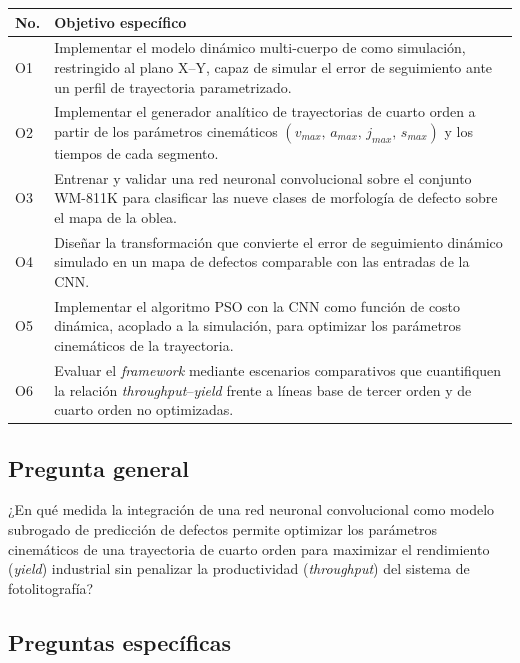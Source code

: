 \documentclass[11pt]{article}
\begin{document}
\begin{table}[H]
\centering
\small
\setlength{\tabcolsep}{6pt}
\renewcommand{\arraystretch}{1.35}
\begin{tabular}{C{0.8cm} L{14cm}}
\toprule
\textbf{No.} & \textbf{Objetivo específico} \\
\midrule
O1 & Implementar el modelo dinámico multi-cuerpo de \cite{Al-Rawashdeh2022_Caracterization} como simulación, restringido al plano X--Y, capaz de simular el error de seguimiento ante un perfil de trayectoria parametrizado. \\
O2 & Implementar el generador analítico de trayectorias de cuarto orden a partir de los parámetros cinemáticos $(v_{max},\,a_{max},\,j_{max},\,s_{max})$ y los tiempos de cada segmento. \\
O3 & Entrenar y validar una red neuronal convolucional sobre el conjunto WM-811K \cite{Wu2015_WM811K} para clasificar las nueve clases de morfología de defecto sobre el mapa de la oblea. \\
O4 & Diseñar la transformación que convierte el error de seguimiento dinámico simulado en un mapa de defectos comparable con las entradas de la CNN. \\
O5 & Implementar el algoritmo PSO con la CNN como función de costo dinámica, acoplado a la simulación, para optimizar los parámetros cinemáticos de la trayectoria. \\
O6 & Evaluar el \textit{framework} mediante escenarios comparativos que cuantifiquen la relación \textit{throughput}--\textit{yield} frente a líneas base de tercer orden y de cuarto orden no optimizadas. \\
\bottomrule
\end{tabular}
\end{table}

\subsection*{Pregunta general}

\begin{framed}
¿En qué medida la integración de una red neuronal convolucional como modelo subrogado de predicción de defectos permite optimizar los parámetros cinemáticos de una trayectoria de cuarto orden para maximizar el rendimiento (\textit{yield}) industrial sin penalizar la productividad (\textit{throughput}) del sistema de fotolitografía?
\end{framed}

\subsection*{Preguntas específicas}
\end{document}
